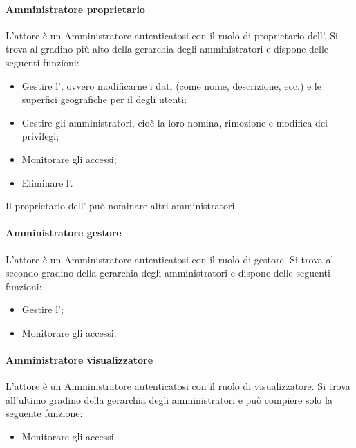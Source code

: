 \paragraph{Amministratore proprietario}
L'attore è un Amministratore autenticatosi con il ruolo di proprietario dell'.
Si trova al gradino più alto della gerarchia degli amministratori e dispone delle seguenti funzioni:
\begin{itemize}
\item Gestire l', ovvero modificarne i dati (come nome, descrizione, ecc.) e le superfici geografiche per il  degli utenti;
\item Gestire gli amministratori, cioè la loro nomina, rimozione e modifica dei privilegi;
\item Monitorare gli accessi;
\item Eliminare l'.
\end{itemize}
Il proprietario dell' può nominare altri amministratori.
\paragraph{Amministratore gestore}
L'attore è un Amministratore autenticatosi con il ruolo di gestore. 
Si trova al secondo gradino della gerarchia degli amministratori e dispone delle seguenti funzioni:
\begin{itemize}
\item Gestire l';
\item Monitorare gli accessi.
\end{itemize}
\paragraph{Amministratore visualizzatore}
L'attore è un Amministratore autenticatosi con il ruolo di visualizzatore.
Si trova all'ultimo gradino della gerarchia degli amministratori e può compiere solo la seguente funzione:
\begin{itemize}
\item Monitorare gli accessi.
\end{itemize}




